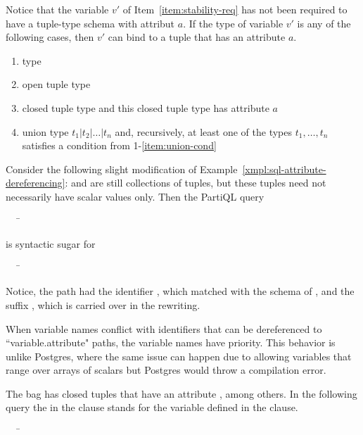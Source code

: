 {Notice that the variable $v'$ of Item~\ref{item:stability-req} has not been
required to have a tuple-type schema with attribut $a$. If the type of variable
$v'$ is any of the following cases, then $v'$ can bind to a tuple that has an
attribute $a$.

\begin{enumerate}
\item type 
\item open tuple type
\item closed tuple type and this closed tuple type has attribute $a$
\item\label{item:union-cond} union type $t_1 | t_2 | \ldots | t_n$ and, recursively, at least one of the types $t_1, \ldots, t_n$ satisfies a condition from 1-\ref{item:union-cond}
\end{enumerate}

\begin{example} 
Consider the following slight modification of
Example~\ref{xmpl:sql-attribute-dereferencing}:  and  are still
collections of tuples, but these tuples need not necessarily have scalar values
only. Then the PartiQL query
\begin{tabbing}
\ \ \ \=\\
\>
\end{tabbing}
\noindent is syntactic sugar for
\begin{tabbing}
\ \ \ \=\\
\>
\end{tabbing}
Notice, the path  had the identifier , which matched with the
schema of , and the suffix \gt{[5]}, which is carried over in the
rewriting.
\end{example}

\begin{example}
\label{xmpl:variable-attribute-conflict}
When variable names conflict with identifiers that can be dereferenced to
``variable.attribute" paths, the variable names have priority. This behavior is
unlike Postgres, where the same issue can happen due to allowing variables that
range over arrays of scalars but Postgres would throw a compilation error.

The bag  has closed tuples that have an attribute , among others. In
the following query the  in the  clause stands for the variable
 defined in the  clause.
\begin{tabbing}
\ \ \ \=\\
\>
\end{tabbing}
\end{example}

}
